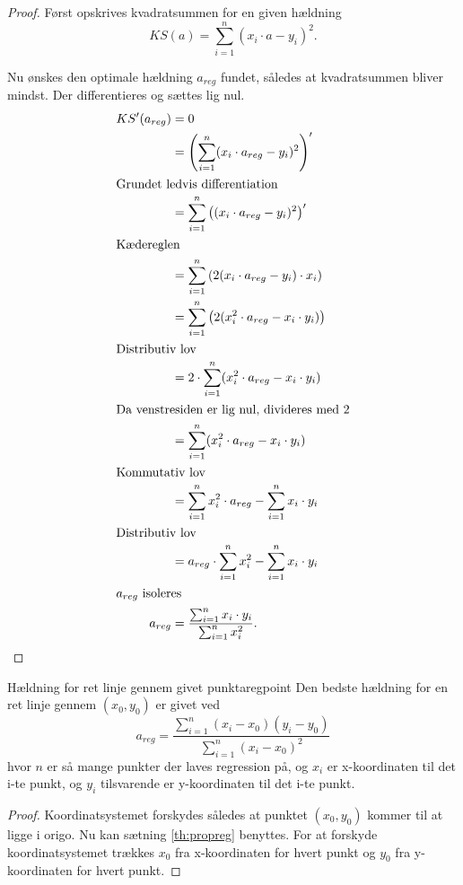 \documentclass{article}
\begin{document}
\begin{proof}
Først opskrives kvadratsummen for en given hældning
\[
    KS(a) = \sum_{i=1}^n (x_i \cdot a - y_i)^2.
\] 

Nu ønskes den optimale hældning $a_{reg}$ fundet, således at kvadratsummen bliver
mindst. Der differentieres og sættes lig nul.
\begin{align*}
    KS'(a_{reg}) &= 0\\
                 &= \left(\sum_{i=1}^n (x_i \cdot a_{reg} - y_i)^2\right)'\\
\intertext{Grundet ledvis differentiation}
                 &= \sum_{i=1}^n \left((x_i \cdot a_{reg} - y_i)^2\right)'\\
                 \intertext{Kædereglen}
                 &= \sum_{i=1}^n \left(2(x_i \cdot a_{reg} - y_i) \cdot x_i\right)\\
                 &= \sum_{i=1}^n \left(2(x_i^2 \cdot a_{reg} - x_i \cdot y_i)\right)\\
                 \intertext{Distributiv lov}
                 &= 2 \cdot \sum_{i=1}^n (x_i^2 \cdot a_{reg} - x_i \cdot y_i)\\
                 \intertext{Da venstresiden er lig nul, divideres med 2}
                 &= \sum_{i=1}^n (x_i^2 \cdot a_{reg} - x_i \cdot y_i)\\
                 \intertext{Kommutativ lov}
                 &= \sum_{i=1}^n x_i^2 \cdot a_{reg} - \sum_{i=1}^n x_i \cdot y_i\\
                 \intertext{Distributiv lov}
                 &= a_{reg} \cdot \sum_{i=1}^n x_i^2 - \sum_{i=1}^n x_i \cdot y_i\\
                 \intertext{$a_{reg}$ isoleres}
         a_{reg} &=  \frac{\sum_{i=1}^n x_i \cdot y_i}{\sum_{i=1}^n x_i^2}.\qedhere
\end{align*}
\end{proof}

\begin{theorem}{Hældning for ret linje gennem givet punkt}{aregpoint}
    Den bedste hældning for en ret linje gennem $(x_0, y_0)$ er givet ved
    \[
        a_{reg} = \frac{\sum_{i=1}^n (x_i-x_0)(y_i-y_0)}{\sum_{i=1}^n (x_i-x_0)^2}
    \] 
    hvor $n$ er så mange punkter der laves regression på, og $x_i$ er x-koordinaten
    til det i-te punkt, og $y_i$ tilsvarende er y-koordinaten til det i-te punkt.
\end{theorem}

\begin{proof}
Koordinatsystemet forskydes således at punktet $(x_0, y_0)$ kommer til at ligge
i origo. Nu kan sætning \ref{th:propreg} benyttes. For at forskyde
koordinatsystemet trækkes $x_0$ fra x-koordinaten for hvert punkt og $y_0$ fra
y-koordinaten for hvert punkt.
\end{proof}
\end{document}
